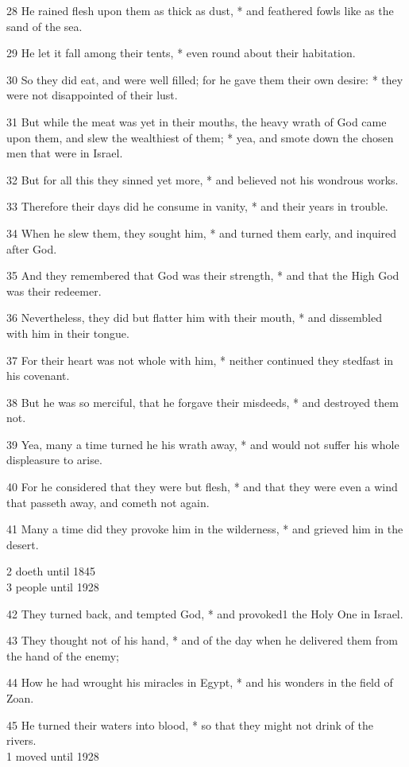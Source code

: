 28 He rained flesh upon them as thick as dust, * and
feathered fowls like as the sand of the sea.

29 He let it fall among their tents, * even round about
their habitation.

30 So they did eat, and were well filled; for he gave
them their own desire: * they were not disappointed of their lust.

31 But while the meat was yet in their mouths, the
heavy wrath of God came upon them, and slew the wealthiest of them; *
yea, and smote down the chosen men that were in Israel.

32 But for all this they sinned yet more, * and believed
not his wondrous works.

33 Therefore their days did he consume in vanity, *
and their years in trouble.

34 When he slew them, they sought him, * and turned
them early, and inquired after God.

35 And they remembered that God was their strength,
* and that the High God was their redeemer.

36 Nevertheless, they did but flatter him with their
mouth, * and dissembled with him in their tongue.

37 For their heart was not whole with him, * neither
continued they stedfast in his covenant.

38 But he was so merciful, that he forgave their misdeeds,
* and destroyed them not.

39 Yea, many a time turned he his wrath away, * and
would not suffer his whole displeasure to arise.

40 For he considered that they were but flesh, * and
that they were even a wind that passeth away, and cometh not again.

41 Many a time did they
provoke him in the wilderness, * and grieved him in the desert.

2 doeth
until 1845\\
3 people
until 1928

42 They turned back, and tempted God, * and provoked1 the Holy
One in Israel.

43 They thought not of his hand, * and of the day when
he delivered them from the hand of the enemy;

44 How he had wrought his miracles in Egypt, * and his
wonders in the field of Zoan.

45 He turned their waters into blood, * so that they
might not drink of the rivers. \\
1 moved
until 1928

